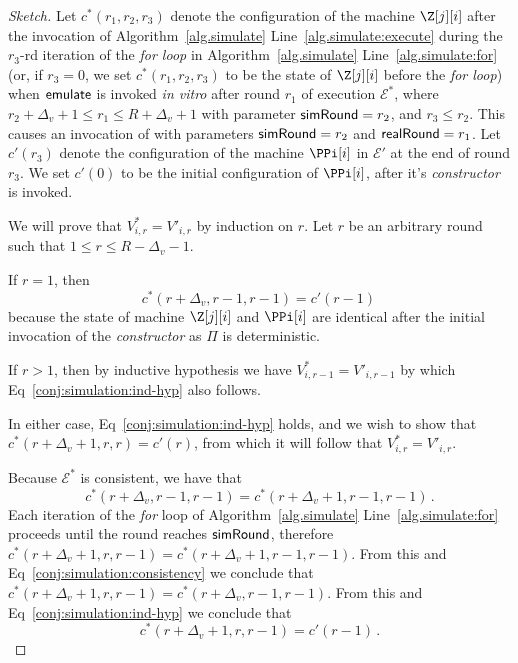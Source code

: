 \begin{proof}[Sketch]
  Let $c^*(r_1, r_2, r_3)$ denote the configuration
  of the machine $\Z[j][i]$ after the invocation of
  Algorithm~\ref{alg.simulate} Line~\ref{alg.simulate:execute}
  during the $r_3$-rd iteration of the \emph{for loop} in
  Algorithm~\ref{alg.simulate} Line~\ref{alg.simulate:for}
  (or, if $r_3 = 0$, we set $c^*(r_1, r_2, r_3)$ to be the state of
  $\Z[j][i]$ before the \emph{for loop})
  when $\textsf{emulate}$ is
  invoked \emph{in vitro} after round $r_1$ of execution $\mathcal{E}^*$,
  where $r_2 + \Delta_v + 1 \leq r_1 \leq R + \Delta_v + 1$ with parameter
  $\textsf{simRound} = r_2$, and $r_3 \leq r_2$.
  This causes an invocation of \simulate with parameters
  $\textsf{simRound} = r_2$ and $\textsf{realRound} = r_1$.
  Let $c'(r_3)$ denote the configuration of the machine $\PPi[i]$
  in $\mathcal{E}'$ at the end of round $r_3$.
  We set $c'(0)$ to be the initial configuration of $\PPi[i]$,
  after it's \emph{constructor} is invoked.

  We will prove that $V^*_{i,r} = V'_{i,r}$ by induction on $r$.
  Let $r$ be an arbitrary round such that $1 \leq r \leq R - \Delta_v - 1$.

  If $r = 1$, then
  \begin{equation}\label{conj:simulation:ind-hyp}
    c^*(r + \Delta_v, r - 1, r - 1) = c'(r - 1)\,
  \end{equation}
  because the state of machine $\Z[j][i]$ and $\PPi[i]$ are identical
  after the initial invocation of the \emph{constructor} as $\Pi$
  is deterministic.

  If $r > 1$, then by inductive hypothesis we have $V^*_{i,r - 1} = V'_{i,r - 1}$
  by which Eq~\ref{conj:simulation:ind-hyp} also follows.

  In either case, Eq~\ref{conj:simulation:ind-hyp} holds, and we
  wish to show that $c^*(r + \Delta_v + 1, r, r) = c'(r)$,
  from which it will follow that $V^*_{i,r} = V'_{i,r}$.

  Because $\mathcal{E}^*$ is consistent, we have that
  \begin{equation}\label{conj:simulation:consistency}
    c^*(r + \Delta_v, r - 1, r - 1) = c^*(r + \Delta_v + 1, r - 1, r - 1)\,.
  \end{equation}
  Each iteration of the \emph{for} loop of Algorithm~\ref{alg.simulate} Line~\ref{alg.simulate:for}
  proceeds until the round reaches $\textsf{simRound}$, therefore
  $c^*(r + \Delta_v + 1, r, r - 1) = c^*(r + \Delta_v + 1, r - 1, r - 1)$.
  From this and Eq~\ref{conj:simulation:consistency} we conclude that
  $c^*(r + \Delta_v + 1, r, r - 1) = c^*(r + \Delta_v, r - 1, r - 1)$.
  From this and Eq~\ref{conj:simulation:ind-hyp} we conclude that
  \begin{equation}\label{conj:simulation:pre-state}
    c^*(r + \Delta_v + 1, r, r - 1) = c'(r - 1)\,.
  \end{equation}


\end{proof}
